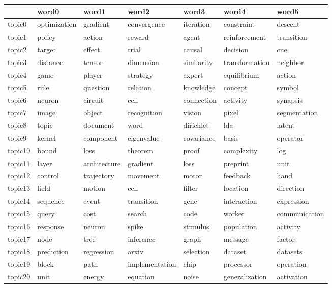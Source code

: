 \documentclass[letterpaper]{article}
\begin{document}
\begin{figure}[ht]
  \centering
  \begin{tabular}{l | l l l l l l}
    &     word0    &      word1 &          word2 &         word3 & word4 &        word5 \\ \hline
    topic0 & optimization & gradient & convergence & iteration & constraint & descent \\
    topic1 & policy & action & reward & agent & reinforcement & transition \\
    topic2 & target & effect & trial & causal & decision & cue \\
    topic3 & distance & tensor & dimension & similarity & transformation & neighbor \\
    topic4 & game & player & strategy & expert & equilibrium & action \\
    topic5 & rule & question & relation & knowledge & concept & symbol \\
    topic6 & neuron & circuit & cell & connection & activity & synapsis \\
    topic7 & image & object & recognition & vision & pixel & segmentation \\
    topic8 & topic & document & word & dirichlet & lda & latent \\
    topic9 & kernel & component & eigenvalue & covariance & basis & operator \\
    topic10 & bound & loss & theorem & proof & complexity & log \\
    topic11 & layer & architecture & gradient & loss & preprint & unit \\
    topic12 & control & trajectory & movement & motor & feedback & hand \\
    topic13 & field & motion & cell & filter & location & direction \\
    topic14 & sequence & event & transition & gene & interaction & expression \\
    topic15 & query & cost & search & code & worker & communication \\
    topic16 & response & neuron & spike & stimulus & population & activity \\
    topic17 & node & tree & inference & graph & message & factor \\
    topic18 & prediction & regression & arxiv & selection & dataset & datasets \\
    topic19 & block & path & implementation & chip & processor & operation \\
    topic20 & unit & energy & equation & noise & generalization & activation \\

\end{tabular}
\end{figure}
\end{document}
